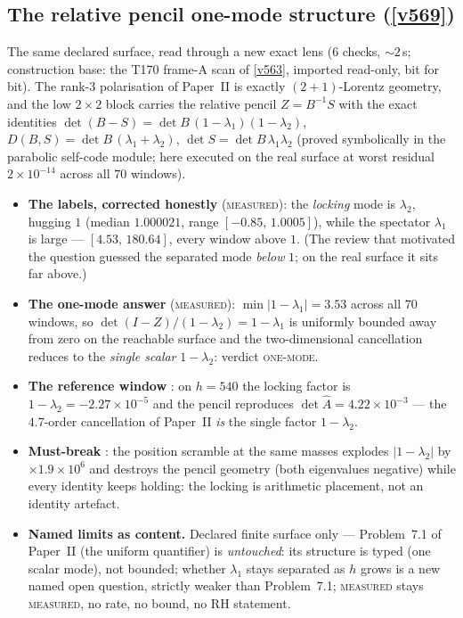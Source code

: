 \documentclass[11pt,a4paper]{article}
\begin{document}
\subsection{The relative pencil one-mode structure (\texorpdfstring{\vref{v569}}{v569})}\label{sec:v569}
The same declared surface, read through a new exact lens
 ($6$ checks, ${\sim}2$\,s; construction
base: the T170 frame-A scan of \vref{v563}, imported read-only, bit for bit).
The rank-3 polarisation of Paper~II is exactly $(2{+}1)$-Lorentz geometry, and
the low $2\times2$ block carries the relative pencil $Z=B^{-1}S$ with the exact
identities $\det(B-S)=\det B\,(1-\lambda_1)(1-\lambda_2)$,
$D(B,S)=\det B\,(\lambda_1{+}\lambda_2)$, $\det S=\det B\,\lambda_1\lambda_2$
(proved symbolically in the parabolic self-code module; here executed on the
real surface at worst residual $2\times10^{-14}$ across all $70$ windows).

\begin{itemize}[leftmargin=1.5em]
\item \textbf{The labels, corrected honestly} (\textsc{measured}): the \emph{locking} mode is
$\lambda_2$, hugging $1$ (median $1.000021$, range $[-0.85,\,1.0005]$), while
the spectator $\lambda_1$ is large --- $[4.53,\,180.64]$, every window above
$1$. (The review that motivated the question guessed the separated mode
\emph{below} $1$; on the real surface it sits far above.)
\item \textbf{The one-mode answer} (\textsc{measured}): $\min|1-\lambda_1|=3.53$ across all
$70$ windows, so $\det(I-Z)/(1-\lambda_2)=1-\lambda_1$ is uniformly bounded
away from zero on the reachable surface and the two-dimensional cancellation
reduces to the \emph{single scalar} $1-\lambda_2$: verdict \textsc{one-mode}.
\item \textbf{The reference window} \mE: on $h=540$ the locking factor is
$1-\lambda_2=-2.27\times10^{-5}$ and the pencil reproduces
$\det\hat A=4.22\times10^{-3}$ --- the $4.7$-order cancellation of Paper~II
\emph{is} the single factor $1-\lambda_2$.
\item \textbf{Must-break} \mE: the position scramble at the same masses
explodes $|1-\lambda_2|$ by $\times1.9\times10^{6}$ and destroys the pencil
geometry (both eigenvalues negative) while every identity keeps holding: the
locking is arithmetic placement, not an identity artefact.
\item \textbf{Named limits as content.} Declared finite surface only ---
Problem~7.1 of Paper~II (the uniform quantifier) is \emph{untouched}: its
structure is typed (one scalar mode), not bounded; whether $\lambda_1$ stays
separated as $h$ grows is a new named open question, strictly weaker than
Problem~7.1; \textsc{measured} stays \textsc{measured}, no rate, no bound, no
RH statement.
\end{itemize}
\end{document}
